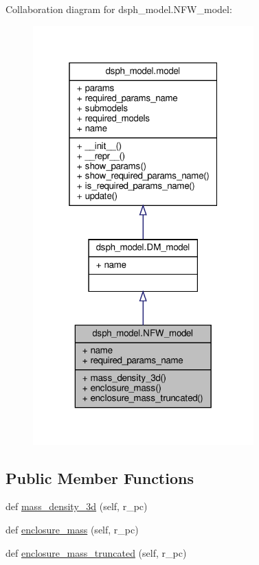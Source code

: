 Collaboration diagram for dsph\+\_\+model.\+N\+F\+W\+\_\+model\+:\nopagebreak
\begin{figure}[H]
\begin{center}
\leavevmode
\includegraphics[width=241pt]{d9/d01/classdsph__model_1_1NFW__model__coll__graph}
\end{center}
\end{figure}
\subsection*{Public Member Functions}
\begin{DoxyCompactItemize}
\item 
def \hyperlink{classdsph__model_1_1NFW__model_a77ffcfcaaa6845c611e882dcf59738f2}{mass\+\_\+density\+\_\+3d} (self, r\+\_\+pc)
\item 
def \hyperlink{classdsph__model_1_1NFW__model_a6cd2ef0f9d8ce7af26d332761af25655}{enclosure\+\_\+mass} (self, r\+\_\+pc)
\item 
def \hyperlink{classdsph__model_1_1NFW__model_ae7c0832d2a9c3edbccdfcffa40987046}{enclosure\+\_\+mass\+\_\+truncated} (self, r\+\_\+pc)
\end{DoxyCompactItemize}
